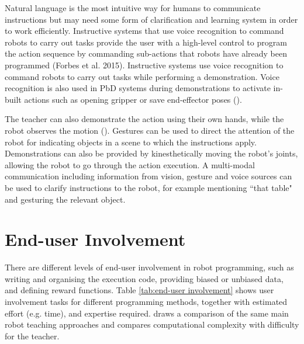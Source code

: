 Natural language is the most intuitive way for humans to communicate instructions but may need some form of clarification and learning system in order to work efficiently. 
Instructive systems that use voice recognition to command robots to carry out tasks provide the user with a high-level control to program the action sequence by commanding sub-actions that robots have already been programmed (Forbes et al. 2015).
Instructive systems use voice recognition to command robots to carry out tasks while performing a demonstration.
Voice recognition is also used in PbD systems during demonstrations to activate in-built actions such as opening gripper or save end-effector poses (\cite{alexandrova2014robot}).

The teacher can also demonstrate the action using their own hands, while the robot observes the motion (\cite{kuniyoshi1994learning}).
Gestures can be used to direct the attention of the robot for indicating objects in a scene to which the instructions apply.
Demonstrations can also be provided by kinesthetically moving the robot's joints, allowing the robot to go through the action execution.
A multi-modal communication including information from vision, gesture and voice sources can be used to clarify instructions to the robot, for example mentioning ``that table" and gesturing the relevant object.


\section{End-user Involvement}
There are different levels of end-user involvement in robot programming, such as writing and organising the execution code, providing biased or unbiased data, and defining reward functions. 
Table \ref{tab:end-user involvement} shows user involvement tasks for different programming methods, together with estimated effort (e.g. time), and expertise required.
\cite{kormushev2013reinforcement} draws a comparison of the same main robot teaching approaches and compares computational complexity with difficulty for the teacher.

